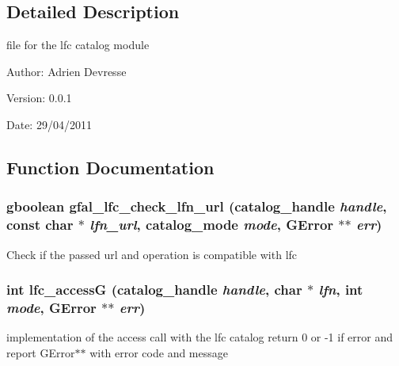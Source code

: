 \subsection{Detailed Description}
file for the lfc catalog module 

\begin{Desc}
\item[Author:]Adrien Devresse \end{Desc}
\begin{Desc}
\item[Version:]0.0.1 \end{Desc}
\begin{Desc}
\item[Date:]29/04/2011 \end{Desc}


\subsection{Function Documentation}
\subsubsection{\setlength{\rightskip}{0pt plus 5cm}gboolean gfal\_\-lfc\_\-check\_\-lfn\_\-url (catalog\_\-handle {\em handle}, const char $\ast$ {\em lfn\_\-url}, catalog\_\-mode {\em mode}, GError $\ast$$\ast$ {\em err})}\label{gfal__common__lfc_8c_8baa624b528deb15ff4ee61fa9948ac8}


Check if the passed url and operation is compatible with lfc 
\subsubsection{\setlength{\rightskip}{0pt plus 5cm}int lfc\_\-access\-G (catalog\_\-handle {\em handle}, char $\ast$ {\em lfn}, int {\em mode}, GError $\ast$$\ast$ {\em err})}\label{gfal__common__lfc_8c_960f3f01cd2e130cda6dc3513154a954}


implementation of the access call with the lfc catalog return 0 or -1 if error and report GError$\ast$$\ast$ with error code and message 
